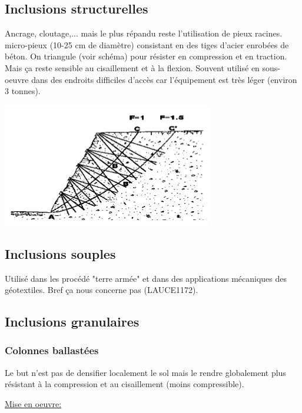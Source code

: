  \subsection{Inclusions structurelles}
 
 Ancrage, cloutage,... mais le plus répandu reste l'utilisation de pieux racines. micro-pieux (10-25 cm de diamètre) consistant en des tiges d'acier enrobées de béton. On triangule (voir schéma) pour résister en compression et en traction. Mais ça reste sensible au cisaillement et à la flexion. Souvent utilisé en sous-oeuvre dans des endroits difficiles d'accès car l'équipement est très léger (environ 3 tonnes).
 
\begin{center}
\includegraphics [scale=0.5]{pictures/b.PNG}
\end{center}

\subsection{Inclusions souples}

Utilisé dans les procédé "terre armée" et dans des applications mécaniques des géotextiles. Bref ça nous concerne pas (LAUCE1172).

\subsection{Inclusions granulaires}

\subsubsection{Colonnes ballastées}

Le but n'est pas de densifier localement le sol mais le rendre globalement plus résistant à la compression et au cisaillement (moins compressible).

\medskip

\underline{Mise en oeuvre:}

